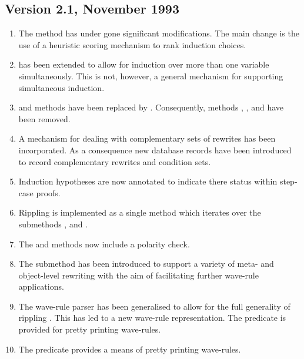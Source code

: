 \subsection {Version 2.1, November 1993}

\begin{enumerate}
\item The  method has under gone significant
modifications. The main change is the use of a heuristic 
scoring mechanism to rank induction choices.

\item {} has been extended to allow for induction
over more than one variable simultaneously. This is not, however,
a general mechanism for supporting simultaneous induction.

\item {} and  methods have been replaced by
. Consequently, methods , ,
 and  have been removed.

\item A mechanism for dealing with complementary sets of rewrites
has been incorporated. As a consequence new database records have 
been introduced to record complementary rewrites and condition sets.

\item Induction hypotheses are now annotated to indicate there
status within step-case proofs.

\item Rippling is implemented as a single method 
which iterates over the submethods , 
and .

\item The  and  methods now 
include a polarity check.

\item The submethod    has been introduced to 
support a variety of meta- and object-level rewriting with 
the aim of facilitating further wave-rule applications.

\item The wave-rule parser has been generalised to allow
for the full generality of rippling \cite{pub567}. This
has led to a new wave-rule representation. The predicate
 is provided for pretty printing wave-rules.

\item The predicate  provides a means of
pretty printing wave-rules.


\end{enumerate}
